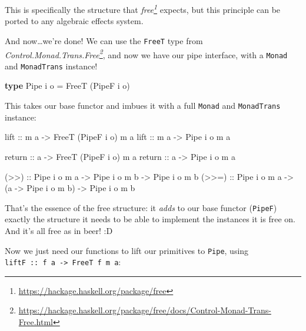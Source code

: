 \documentclass[]{article}
\newenvironment{Shaded}{}{}
\newcommand{\DataTypeTok}[1]{\textcolor[rgb]{0.56,0.13,0.00}{#1}}
\newcommand{\FunctionTok}[1]{\textcolor[rgb]{0.02,0.16,0.49}{#1}}
\newcommand{\KeywordTok}[1]{\textcolor[rgb]{0.00,0.44,0.13}{\textbf{#1}}}
\newcommand{\NormalTok}[1]{#1}
\newcommand{\OtherTok}[1]{\textcolor[rgb]{0.00,0.44,0.13}{#1}}
\renewcommand{\href}[2]{#2\footnote{\url{#1}}}
\begin{document}
This is specifically the structure that
\emph{\href{https://hackage.haskell.org/package/free}{free}} expects, but this
principle can be ported to any algebraic effects system.

And now\ldots we're done! We can use the \texttt{FreeT} type from
\emph{\href{https://hackage.haskell.org/package/free/docs/Control-Monad-Trans-Free.html}{Control.Monad.Trans.Free}},
and now we have our pipe interface, with a \texttt{Monad} and
\texttt{MonadTrans} instance!

\begin{Shaded}
\begin{Highlighting}[]
\KeywordTok{type} \DataTypeTok{Pipe}\NormalTok{ i o }\OtherTok{=} \DataTypeTok{FreeT}\NormalTok{ (}\DataTypeTok{PipeF}\NormalTok{ i o)}
\end{Highlighting}
\end{Shaded}

This takes our base functor and imbues it with a full \texttt{Monad} and
\texttt{MonadTrans} instance:

\begin{Shaded}
\begin{Highlighting}[]
\OtherTok{lift ::}\NormalTok{ m a }\OtherTok{{-}>} \DataTypeTok{FreeT}\NormalTok{ (}\DataTypeTok{PipeF}\NormalTok{ i o) m a}
\OtherTok{lift ::}\NormalTok{ m a }\OtherTok{{-}>} \DataTypeTok{Pipe}\NormalTok{ i o m a}

\FunctionTok{return}\OtherTok{ ::}\NormalTok{ a }\OtherTok{{-}>} \DataTypeTok{FreeT}\NormalTok{ (}\DataTypeTok{PipeF}\NormalTok{ i o) m a}
\FunctionTok{return}\OtherTok{ ::}\NormalTok{ a }\OtherTok{{-}>} \DataTypeTok{Pipe}\NormalTok{ i o m a}

\OtherTok{(>>)  ::} \DataTypeTok{Pipe}\NormalTok{ i o m a }\OtherTok{{-}>} \DataTypeTok{Pipe}\NormalTok{ i o m b }\OtherTok{{-}>} \DataTypeTok{Pipe}\NormalTok{ i o m b}
\OtherTok{(>>=) ::} \DataTypeTok{Pipe}\NormalTok{ i o m a }\OtherTok{{-}>}\NormalTok{ (a }\OtherTok{{-}>} \DataTypeTok{Pipe}\NormalTok{ i o m b) }\OtherTok{{-}>} \DataTypeTok{Pipe}\NormalTok{ i o m b}
\end{Highlighting}
\end{Shaded}

That's the essence of the free structure: it \emph{adds} to our base functor
(\texttt{PipeF}) exactly the structure it needs to be able to implement the
instances it is free on. And it's all free as in beer! :D

Now we just need our functions to lift our primitives to \texttt{Pipe}, using
\texttt{liftF\ ::\ f\ a\ -\textgreater{}\ FreeT\ f\ m\ a}:
\end{document}
